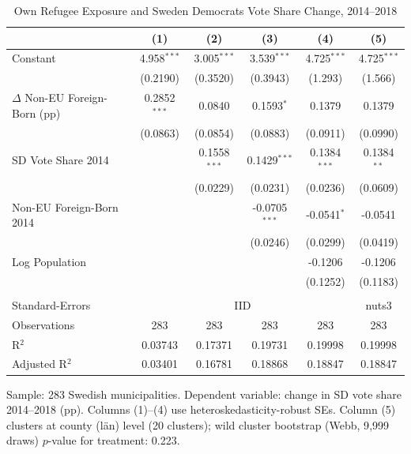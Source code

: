 
\begin{table}[htbp]
   \caption{\label{tab:own_exposure} Own Refugee Exposure and Sweden Democrats Vote Share Change, 2014--2018}
   \bigskip
   \centering
   \begin{tabular}{lccccc}
      \toprule
                                         & (1)            & (2)            & (3)             & (4)            & (5)\\  
      \midrule 
      Constant                           & 4.958$^{***}$  & 3.005$^{***}$  & 3.539$^{***}$   & 4.725$^{***}$  & 4.725$^{***}$\\   
                                         & (0.2190)       & (0.3520)       & (0.3943)        & (1.293)        & (1.566)\\   
      $\Delta$ Non-EU Foreign-Born (pp)  & 0.2852$^{***}$ & 0.0840         & 0.1593$^{*}$    & 0.1379         & 0.1379\\   
                                         & (0.0863)       & (0.0854)       & (0.0883)        & (0.0911)       & (0.0990)\\   
      SD Vote Share 2014                 &                & 0.1558$^{***}$ & 0.1429$^{***}$  & 0.1384$^{***}$ & 0.1384$^{**}$\\   
                                         &                & (0.0229)       & (0.0231)        & (0.0236)       & (0.0609)\\   
      Non-EU Foreign-Born 2014           &                &                & -0.0705$^{***}$ & -0.0541$^{*}$  & -0.0541\\   
                                         &                &                & (0.0246)        & (0.0299)       & (0.0419)\\   
      Log Population                     &                &                &                 & -0.1206        & -0.1206\\   
                                         &                &                &                 & (0.1252)       & (0.1183)\\   
       \\
      Standard-Errors & \multicolumn{4}{c}{IID} & nuts3 \\ 
      Observations                       & 283            & 283            & 283             & 283            & 283\\  
      R$^2$                              & 0.03743        & 0.17371        & 0.19731         & 0.19998        & 0.19998\\  
      Adjusted R$^2$                     & 0.03401        & 0.16781        & 0.18868         & 0.18847        & 0.18847\\  
      \bottomrule
   \end{tabular}
   
   \par \raggedright 
   Sample: 283 Swedish municipalities. Dependent variable: change in SD vote share 2014--2018 (pp). Columns (1)--(4) use heteroskedasticity-robust SEs. Column (5) clusters at county (l\"an) level (20 clusters); wild cluster bootstrap (Webb, 9{,}999 draws) $p$-value for treatment: 0.223.
\end{table}


